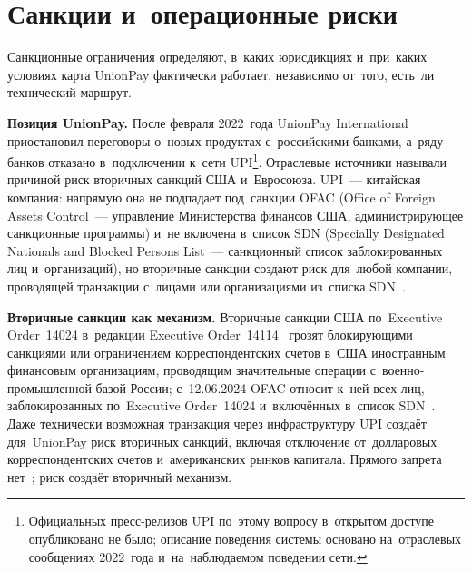 
\section{Санкции и~операционные риски}\label{sec:up-sanctions}

Санкционные ограничения определяют, в~каких юрисдикциях и~при~каких условиях
карта UnionPay фактически работает, независимо от~того, есть~ли технический
маршрут.

\textbf{Позиция UnionPay.} После февраля 2022~года UnionPay International
приостановил переговоры о~новых продуктах с~российскими банками, а~ряду банков
отказано в~подключении к~сети UPI\footnote{Официальных пресс-релизов UPI
  по~этому вопросу в~открытом доступе опубликовано не было; описание поведения
  системы основано на~отраслевых сообщениях 2022~года и~на~наблюдаемом поведении
сети.}. Отраслевые источники называли причиной риск вторичных санкций США
и~Евросоюза. UPI~--- китайская компания: напрямую она не подпадает под~санкции
OFAC (Office of Foreign Assets Control~--- управление Министерства финансов США,
администрирующее санкционные программы) и~не включена в~список SDN (Specially
  Designated Nationals and Blocked Persons List~--- санкционный список
заблокированных лиц и~организаций), но вторичные санкции создают риск для~любой
компании, проводящей транзакции с~лицами или организациями из~списка
SDN~\cite{ofac-sanctions-list-service}.

\textbf{Вторичные санкции как механизм.} Вторичные санкции США по~Executive Order~14024
в~редакции Executive Order~14114~\cite{ofac-eo-14114} грозят блокирующими санкциями или ограничением
корреспондентских счетов в~США иностранным финансовым организациям, проводящим
значительные операции с~военно-промышленной базой России; с~12.06.2024 OFAC
относит к~ней всех лиц, заблокированных по~Executive Order~14024 и~включённых в~список
SDN~\cite{ofac-ffi-advisory-2024}. Даже технически возможная
транзакция через инфраструктуру UPI создаёт для~UnionPay риск вторичных санкций,
включая отключение от~долларовых корреспондентских счетов и~американских рынков
капитала. Прямого запрета нет~\cite{ofac-compliance-framework}; риск создаёт
вторичный механизм.

